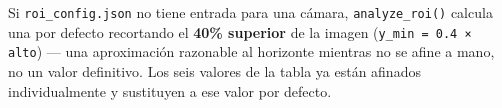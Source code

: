 \begin{infobox}
Si \texttt{roi\_config.json} no tiene entrada para una cámara, \texttt{analyze\_roi()} calcula
una por defecto recortando el \textbf{40\% superior} de la imagen (\texttt{y\_min = 0.4 ×
alto}) — una aproximación razonable al horizonte mientras no se afine a mano, no un valor
definitivo. Los seis valores de la tabla ya están afinados individualmente y sustituyen a
ese valor por defecto.
\end{infobox}

